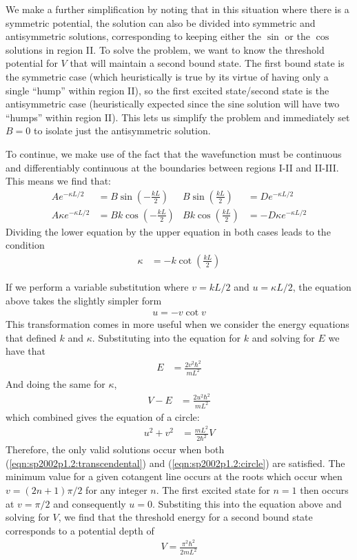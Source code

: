 We make a further simplification by noting that in this situation where there
is a symmetric potential, the solution can also be divided into symmetric
and antisymmetric solutions, corresponding to keeping either the $\sin$ or
the $\cos$ solutions in region II. To solve the problem, we want to know the
threshold potential for $V$ that will maintain a second bound state. The first
bound state is the symmetric case (which heuristically is true by its virtue
of having only a single ``hump'' within region II), so the first excited
state/second state is the antisymmetric case (heuristically expected since
the sine solution will have two ``humps'' within region II). This lets us
simplify the problem and immediately set $B = 0$ to isolate just the
antisymmetric solution.

To continue, we make use of the fact that the wavefunction must be continuous
and differentiably continuous at the boundaries between regions I-II and
II-III. This means we find that:
\begin{align*}
    Ae^{-\kappa L/2} &= B\sin(-\frac{kL}{2})
    & B\sin(\frac{kL}{2}) &= De^{-\kappa L/2}
    \\
    A\kappa e^{-\kappa L/2} &= Bk\cos(-\frac{kL}{2})
    & Bk\cos(\frac{kL}{2}) &= -D\kappa e^{-\kappa L/2}
\end{align*}
Dividing the lower equation by the upper equation in both cases leads to the
condition
\begin{align*}
    \kappa  &= -k\cot(\frac{kL}{2})
\end{align*}

If we perform a variable substitution where $v = kL/2$ and $u = \kappa L/2$, the
equation above takes the slightly simpler form
\begin{align}
    u = -v\cot v
	\label{eqn:sp2002p1.2:transcendental}
\end{align}
This transformation comes in more useful when we consider the energy equations
that defined $k$ and $\kappa $. Substituting into the equation for $k$ and solving
for $E$ we have that
\begin{align*}
    E &= \frac{2v^2{\hbar}^2}{mL^2}
\end{align*}
And doing the same for $\kappa $,
\begin{align*}
    V - E &= \frac{2u^2{\hbar}^2}{mL^2}
\end{align*}
which combined gives the equation of a circle:
\begin{align*}
    u^2 + v^2 &= \frac{mL^2}{2{\hbar}^2}V
	\label{eqn:sp2002p1.2:circle}
\end{align*}
Therefore, the only valid solutions occur when both
(\ref{eqn:sp2002p1.2:transcendental}) and (\ref{eqn:sp2002p1.2:circle}) are
satisfied. The minimum value for a given cotangent line occurs at the roots
which occur when $v = (2n+1){\pi} /2$ for any integer $n$. The first excited state
for $n=1$ then occurs at $v = {\pi} /2$ and consequently $u = 0$. Substiting this
into the equation above and solving for $V$, we find that the threshold energy
for a second bound state corresponds to a potential depth of
\begin{align}
    \boxed{ V = \frac{{\pi} ^2{\hbar}^2}{2mL^2} }
\end{align}

